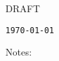 \thispagestyle{empty}
\begin{center}
\small{DRAFT}

\LARGE{\textsf{\thesistitle}}

\small{\texttt{\today}}

\noindent\makebox[\linewidth]{\rule{\paperwidth}{0.4pt}}

\vspace{1cm}
\end{center}

Notes:

\iftodonotes
  \listoftodos
\fi

\cleardoublepage
